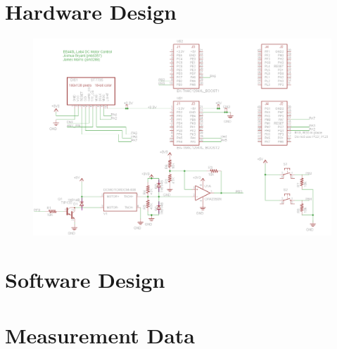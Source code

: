 \documentclass{article}
\begin{document}
\section{Hardware Design}
	\begin{figure}[h]
		\includegraphics[keepaspectratio, width=\textwidth]{Lab4Graphics/finalSchematic.png}
	\end{figure}

\section{Software Design}

\section{Measurement Data}

\end{document}
